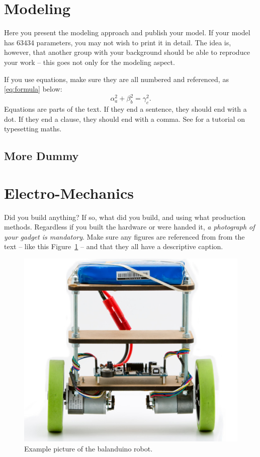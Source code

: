 \documentclass{LTHtwocol} %
\newcommand{\figref}[1]{Figure~\ref{#1}}
\begin{document}
\section{Modeling}
Here you present the modeling approach and publish your model. If your model has 63434 parameters, you may not wish to print it in detail. The idea is, however, that another group with your background should be able to reproduce your work -- this goes not only for the modeling aspect.

If you use equations, make sure they are all numbered and referenced, as \eqref{eq:formula} below:
\begin{equation}
\alpha_a^2 + \beta_b^2 = \gamma_c^2.
\label{eq:formula}
\end{equation}
Equations are parts of the text. If they end a sentence, they should end with a dot. If they end a clause, they should end with a comma. See \cite{mathslatexwiki} for a tutorial on typesetting maths.
\subsection{More Dummy}
\kant[2]

\section{Electro-Mechanics}
Did you build anything? If so, what did you build, and using what production methods. Regardless if you built the hardware or were handed it, \emph{a photograph of your gadget is mandatory}. Make sure any figures are referenced from from the text -- like this \figref{fig:gadget} -- and that they all have a descriptive caption.
\begin{figure}[b]
	\centering
	\includegraphics[width=0.7\columnwidth]{balanduino}
	\caption{Example picture of the balanduino robot.}
	\label{fig:gadget} %
\end{figure}
\end{document}
